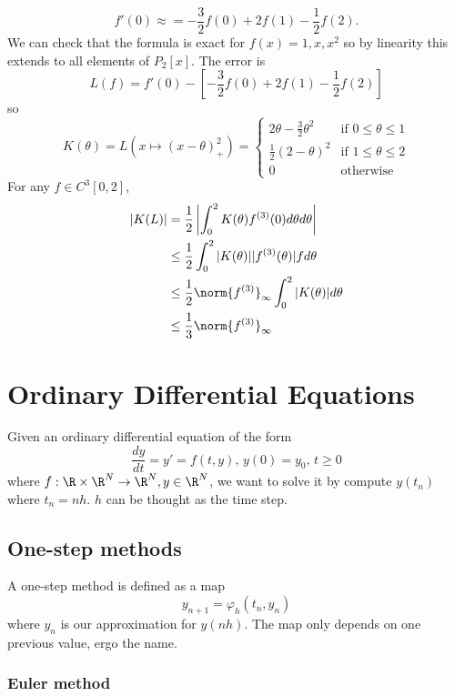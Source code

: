 \documentclass[a4paper]{article}
\begin{document}
\begin{eg}
  \[
    f'(0) \approx = -\frac{3}{2}f(0) + 2f(1) - \frac{1}{2}f(2).
  \]
  We can check that the formula is exact for \(f(x) = 1, x, x^2\) so by linearity this extends to all elements of \(P_2[x]\). The error is
  \[
    L(f) = f'(0) - [-\frac{3}{2}f(0) + 2f(1) - \frac{1}{2}f(2)]
  \]
  so
  \[
    K(\theta) = L(x \mapsto (x - \theta)_+^2) =
    \begin{cases}
      2\theta - \frac{3}{2}\theta^2 & \text{if } 0 \leq \theta \leq 1 \\
      \frac{1}{2}(2 - \theta)^2 & \text{if } 1 \leq \theta \leq 2 \\
      0 & \text{otherwise}
    \end{cases}
  \]
  For any \(f \in C^3[0, 2]\),
  \begin{align*}
    |K(L)|
    &= \frac{1}{2} \left| \int_0^2 K(\theta)f^{(3)}(0)d\theta d\theta \right| \\
    &\leq \frac{1}{2} \int_0^2 |K(\theta)||f^{(3)}(\theta)|fd\theta \\
    &\leq \frac{1}{2} \norm{f^{(3)}}_\infty \int_0^2 |K(\theta)| d\theta \\
    &\leq \frac{1}{3} \norm{f^{(3)}}_\infty
  \end{align*}
\end{eg}

\section{Ordinary Differential Equations}

Given an ordinary differential equation of the form
\[
  \frac{dy}{dt} = y' = f(t, y),\, y(0) = y_0,\, t \geq 0
\]
where \(f: \R \times \R^N \to \R^N, y \in \R^N\), we want to solve it by compute \(y(t_n)\) where \(t_n = nh\). \(h\) can be thought as the time step.

\subsection{One-step methods}

A one-step method is defined as a map
\[
  y_{n + 1} = \varphi_h(t_n, y_n)
\]
where \(y_n\) is our approximation for \(y(nh)\). The map only depends on one previous value, ergo the name.

\subsubsection{Euler method}
\end{document}
